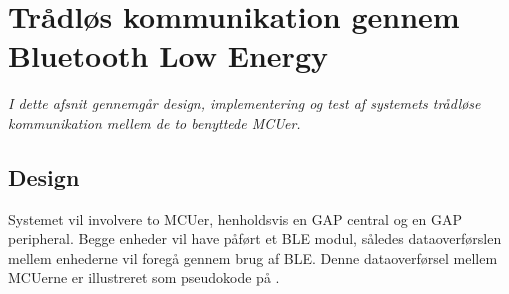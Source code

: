 \section{Trådløs kommunikation gennem Bluetooth Low Energy}
\textit{I dette afsnit gennemgår design, implementering og test af systemets trådløse kommunikation mellem de to benyttede MCUer.}

\subsection{Design}
Systemet vil involvere to MCUer, henholdsvis en GAP central og en GAP peripheral. Begge enheder vil have påført et BLE modul, således dataoverførslen mellem enhederne vil foregå gennem brug af BLE. Denne dataoverførsel mellem MCUerne er illustreret som pseudokode på . 

